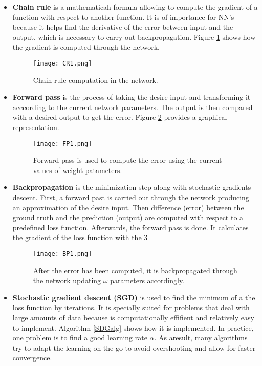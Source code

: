 \begin{itemize}
\item \textbf{Chain rule} is a mathematicah formula allowing to compute the gradient of a function with respect to another function. It is of importance for NN's because it helps find the derivative of the error between input and the output, which is necessary to carry out backpropagation. Figure \ref{fig:CRim1} shows how the  gradient is computed through the network.

\begin{figure}[tb] 
\centering 
\texttt{[image: CR1.png]} 
\caption[Chain rule in neural networks]{Chain rule computation in the network.}
\label{fig:CRim1} 
\end{figure}

\item \textbf{Forward pass} is the process of taking the desire input and transforming it acccording to the current network parameters. The output is then compared with a desired output to get the error. Figure \ref{fig:FPim1} provides a graphical representation. 

\begin{figure}[tb] 
\centering 
\texttt{[image: FP1.png]} 
\caption[Forward pass to compute error]{Forward pass is used to compute the error using the current values of weight patameters.}
\label{fig:FPim1} 
\end{figure}

\item \textbf{Backpropagation} is the minimization step along with stochastic gradients descent. First, a forward past is carried out through the network producing an approximation of the desire input. Then difference (error) between the ground  truth and the prediction (output) are computed with respect to a predefined loss function. Afterwards, the forward pass is done. It calculates the gradient of the loss function with the   
\ref{fig:BPim1}

\begin{figure}[tb] 
\centering 
\texttt{[image: BP1.png]} 
\caption[Backpropagation process through the network]{After the error has been computed, it is backpropagated through the network updating $\omega$ parameters accordingly.}
\label{fig:BPim1} 
\end{figure} 	

\item \textbf{Stochastic gradient descent (SGD)} is used to find the minimum of a the loss function by iterations. It is specially suited for problems that deal with large amounts of data because is computationally effifient and relatively easy to implement. Algorithm \ref{SDGalg} shows how it is implemented. In practice, one problem is to find a good learning rate $\alpha$. As aresult, many algorithms try to adapt the learning on the go to avoid overshooting and allow for faster convergence.  


\end{itemize}
